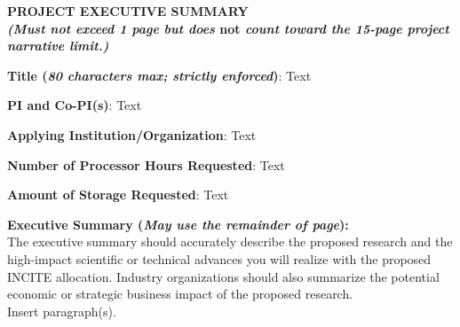 \documentclass[11pt,letterpaper,english]{article}
\begin{document}
\setlength{\parindent}{0in} %

\pagestyle{fancy}   \renewcommand{%
\headrulewidth}{0.0pt}

\begin{center}
\bf {PROJECT EXECUTIVE SUMMARY} \\
{\bf \small {\em (Must not exceed 1 page but does} not {\em count toward the 15-page project narrative limit.)}}
\end{center}


\bigskip

\textbf{Title (\emph{80 characters max; strictly enforced})}: Text \smallskip

\textbf{PI and Co-PI(s)}: Text \smallskip

\textbf{Applying Institution/Organization}: Text \smallskip

\textbf{Number of Processor Hours Requested}: Text \smallskip

\textbf{Amount of Storage Requested}: Text \smallskip

\textbf{Executive Summary ({\emph{May use the remainder of page}}):} \\

The executive summary should accurately describe the proposed research and the high-impact scientific or technical advances you will realize with the proposed INCITE allocation. Industry organizations should also summarize the potential economic or strategic business impact of the proposed research.\\
\vspace{.15in}
Insert paragraph(s). 

\end{document}

